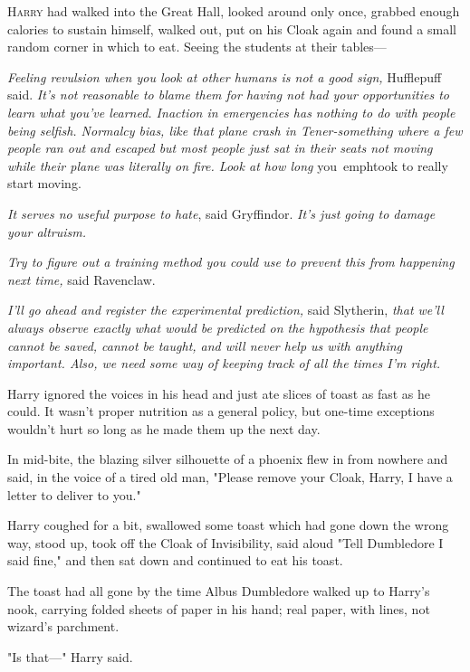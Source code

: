
\lettrine{H}{arry} had walked 
into the Great Hall, looked around only once, grabbed enough calories to 
sustain himself, walked out, put on his Cloak again and found a small random 
corner in which to eat. Seeing the students at their tables---

\emph{Feeling revulsion when you look at other humans is not a good sign,} 
Hufflepuff said. \emph{It's not reasonable to blame them for having not had 
your opportunities to learn what you've learned. Inaction in emergencies has 
nothing to do with people being selfish. Normalcy bias, like that plane crash 
in Tener-something where a few people ran out and escaped but most people just 
sat in their seats not moving while their plane was literally on fire. Look at 
how long} you\ emph{took to really start moving.}

\emph{It serves no useful purpose to hate}, said Gryffindor. \emph{It's just 
going to damage your altruism.}

\emph{Try to figure out a training method you could use to prevent this from 
happening next time,} said Ravenclaw.

\emph{I'll go ahead and register the experimental prediction,} said Slytherin, 
\emph{that we'll always observe exactly what would be predicted on the 
hypothesis that people cannot be saved, cannot be taught, and will never help 
us with anything important. Also, we need some way of keeping track of all the 
times I'm right.}

Harry ignored the voices in his head and just ate slices of toast as fast as he 
could. It wasn't proper nutrition as a general policy, but one-time exceptions 
wouldn't hurt so long as he made them up the next day.

In mid-bite, the blazing silver silhouette of a phoenix flew in from nowhere 
and said, in the voice of a tired old man, "Please remove your Cloak, Harry, I 
have a letter to deliver to you."

Harry coughed for a bit, swallowed some toast which had gone down the wrong 
way, stood up, took off the Cloak of Invisibility, said aloud "Tell Dumbledore 
I said fine," and then sat down and continued to eat his toast.

The toast had all gone by the time Albus Dumbledore walked up to Harry's nook, 
carrying folded sheets of paper in his hand; real paper, with lines, not 
wizard's parchment.

"Is that---" Harry said.

